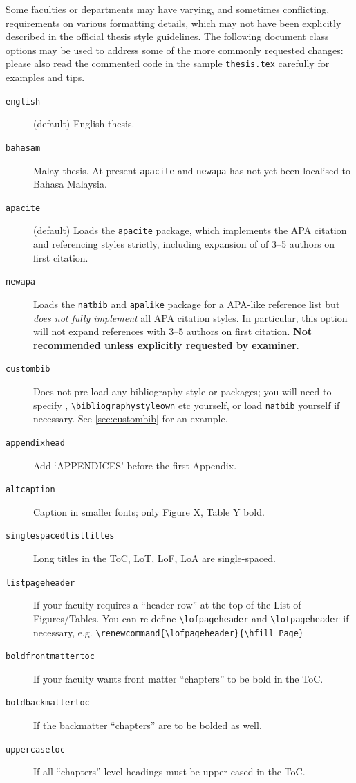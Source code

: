 Some faculties or departments may have varying, and sometimes conflicting, requirements on various formatting details, which may not have been explicitly described in the official thesis style guidelines. The following document class options may be used to address some of the more commonly requested changes: please also read the commented code in the sample \texttt{thesis.tex} carefully for examples and tips.

\begin{description}
\item[\texttt{english}] (default) English thesis.

\item[\texttt{bahasam}] Malay thesis. At present \texttt{apacite} and \texttt{newapa} has not yet been localised to Bahasa Malaysia.


\item[\texttt{apacite}] (default) Loads the \texttt{apacite} package, which implements the APA
   citation and referencing styles strictly, including expansion of
   of 3--5 authors on first citation.

\item[\texttt{newapa}] Loads the \texttt{natbib} and \texttt{apalike} package for a APA-like reference list
   but \emph{does not fully implement} all APA citation styles. In particular,
   this option will not expand references with 3--5 authors on first citation.
   \textbf{Not recommended unless explicitly requested by examiner}.

\item[\texttt{custombib}] Does not pre-load any bibliography style or packages; you will need to
   specify \verb||, \verb|\bibliographystyleown| etc yourself, or load \texttt{natbib} yourself if necessary. See \ref{sec:custombib} for an example.

\item[\texttt{appendixhead}] Add `APPENDICES' before the first Appendix.

\item[\texttt{altcaption}] Caption in smaller fonts; only Figure X, Table Y bold.

\item[\texttt{singlespacedlisttitles}] Long titles in the ToC, LoT, LoF, LoA are single-spaced.

\item[\texttt{listpageheader}] If your faculty requires a ``header row'' at the top of
   the List of Figures/Tables. You can re-define \verb|\lofpageheader| and
   \verb|\lotpageheader| if necessary, e.g.
          \verb|\renewcommand{\lofpageheader}{\hfill Page}|

\item[\texttt{boldfrontmattertoc}] If your faculty wants front matter ``chapters'' to be
   bold in the ToC.

\item[\texttt{boldbackmattertoc}] If the backmatter ``chapters'' are to be bolded as well.

\item[\texttt{uppercasetoc}] If all ``chapters'' level headings must be upper-cased in the ToC.

\end{description}

